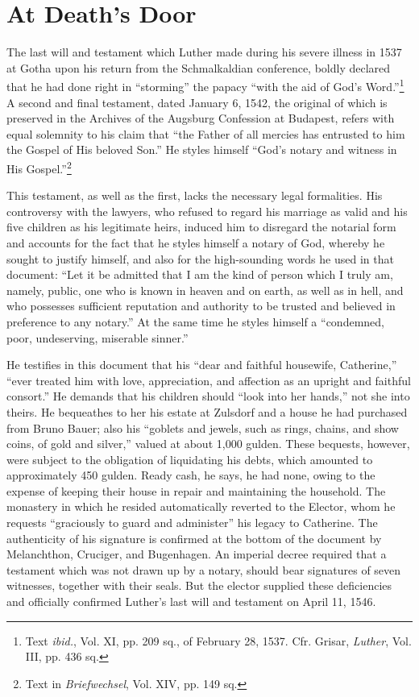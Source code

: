 \section{At Death’s Door}

The last will and testament which Luther made during his severe
illness in 1537 at Gotha upon his return from the Schmalkaldian conference,
boldly declared that he had done right in “storming” the
papacy “with the aid of God’s Word.”\footnote
{Text \textit{ibid.}, Vol. XI, pp. 209 sq., of February 28, 1537. Cfr. Grisar, \textit{Luther}, Vol. III,
pp. 436 sq.}
A second and final testament,
dated January 6, 1542, the original of which is preserved in the
Archives of the Augsburg Confession at Budapest, refers with equal
solemnity to his claim that “the Father of all mercies has entrusted
to him the Gospel of His beloved Son.” He styles himself “God’s notary
and witness in His Gospel.”\footnote{Text in \textit{Briefwechsel}, Vol. XIV, pp. 149 sq.}

This testament, as well as the first, lacks the necessary legal formalities.
His controversy with the lawyers, who refused to regard his
marriage as valid and his five children as his legitimate heirs, induced
him to disregard the notarial form and accounts for the fact that he
styles himself a notary of God, whereby he sought to justify himself,
and also for the high-sounding words he used in that document:
``Let it be admitted that I am the kind of person which I truly am,
namely, public, one who is known in heaven and on earth, as well
as in hell, and who possesses sufficient reputation and authority to
be trusted and believed in preference to any notary.” At the same
time he styles himself a “condemned, poor, undeserving, miserable
sinner.”

He testifies in this document that his “dear and faithful housewife,
Catherine,” “ever treated him with love, appreciation, and affection
as an upright and faithful consort.” He demands that his children
should “look into her hands,” not she into theirs. He bequeathes to
her his estate at Zulsdorf and a house he had purchased from Bruno
Bauer; also his “goblets and jewels, such as rings, chains, and show
coins, of gold and silver,” valued at about 1,000 gulden. These bequests,
however, were subject to the obligation of liquidating his
debts, which amounted to approximately 450 gulden. Ready cash,
he says, he had none, owing to the expense of keeping their house
in repair and maintaining the household. The monastery in which he
resided automatically reverted to the Elector, whom he requests “graciously
to guard and administer” his legacy to Catherine. The
authenticity of his signature is confirmed at the bottom of the document
by Melanchthon, Cruciger, and Bugenhagen. An imperial decree required
that a testament which was not drawn up by a notary,
should bear signatures of seven witnesses, together with their seals.
But the elector supplied these deficiencies and officially confirmed
Luther’s last will and testament on April 11, 1546.

